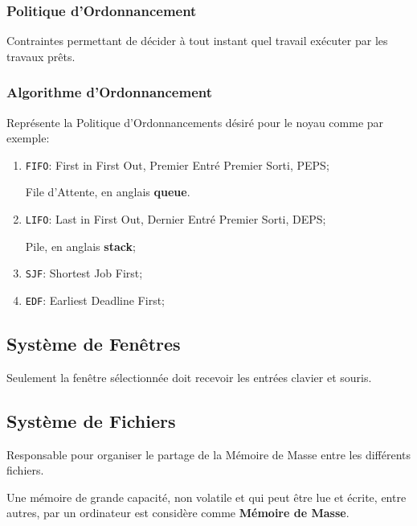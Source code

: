\documentclass{article}
\begin{document}
\subsubsection{Politique d'Ordonnancement}
\begin{definition}\label{def:politiqueOrdonnancement}
    Contraintes permettant de décider à tout instant quel travail exécuter par les travaux prêts.
\end{definition}
\subsubsection{Algorithme d'Ordonnancement}
\begin{definition}\label{def:algorithmeOrdonnancement}
    Représente la Politique d'Ordonnancements désiré pour le noyau comme par exemple:
    \begin{enumerate}[noitemsep, rightmargin = \leftmargin]
        \item \texttt{FIFO}: First in First Out, Premier Entré Premier Sorti, PEPS;
        \begin{example}\label{def:queue}
            File d'Attente, en anglais \textbf{queue}.
        \end{example}
        \item \texttt{LIFO}: Last in First Out, Dernier Entré Premier Sorti, DEPS;
        \begin{example}\label{def:stack}
            Pile, en anglais \textbf{stack};
        \end{example}
        \item \texttt{SJF}: Shortest Job First;
        \item \texttt{EDF}: Earliest Deadline First;
    \end{enumerate}
\end{definition}


\subsection{Système de Fenêtres}
\begin{definition}\label{def:systemeFenetres}
    Seulement la fenêtre sélectionnée doit recevoir les entrées clavier et souris.
\end{definition}

\subsection{Système de Fichiers}
\begin{definition}\label{def:systemeFichiers}
    Responsable pour organiser le partage de la Mémoire de Masse entre les différents fichiers.

    \begin{remark}
        Une mémoire de grande capacité, non volatile et qui peut être lue et écrite, entre autres, par un ordinateur est considère comme \textbf{Mémoire de Masse}.
    \end{remark}
\end{definition}
\end{document}
